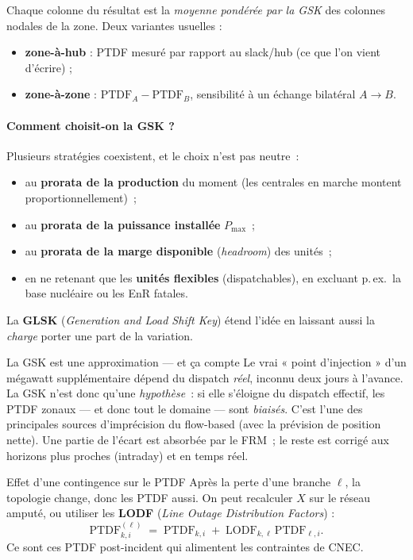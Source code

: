 \documentclass[11pt,a4paper]{article}
\begin{document}
\noindent Chaque colonne du résultat est la \emph{moyenne pondérée par la
GSK} des colonnes nodales de la zone. Deux variantes usuelles :
\begin{itemize}[nosep,leftmargin=1.4em]
  \item \textbf{zone-à-hub} : PTDF mesuré par rapport au slack/hub
        (ce que l'on vient d'écrire) ;
  \item \textbf{zone-à-zone} : $\mathrm{PTDF}_A - \mathrm{PTDF}_B$,
        sensibilité à un échange bilatéral $A\!\to\!B$.
\end{itemize}

\paragraph{Comment choisit-on la GSK ?} Plusieurs stratégies coexistent, et
le choix n'est pas neutre~:
\begin{itemize}[nosep,leftmargin=1.4em]
  \item au \textbf{prorata de la production} du moment (les centrales en
        marche montent proportionnellement)~;
  \item au \textbf{prorata de la puissance installée} $P_{\max}$~;
  \item au \textbf{prorata de la marge disponible} (\emph{headroom}) des
        unités~;
  \item en ne retenant que les \textbf{unités flexibles} (dispatchables),
        en excluant p.\,ex.\ la base nucléaire ou les EnR fatales.
\end{itemize}
La \textbf{GLSK} (\emph{Generation and Load Shift Key}) étend l'idée en
laissant aussi la \emph{charge} porter une part de la variation.

\begin{rembox}{La GSK est une approximation — et ça compte}
Le vrai « point d'injection » d'un mégawatt supplémentaire dépend du dispatch
\emph{réel}, inconnu deux jours à l'avance. La GSK n'est donc qu'une
\emph{hypothèse}~: si elle s'éloigne du dispatch effectif, les PTDF zonaux —
et donc tout le domaine — sont \emph{biaisés}. C'est l'une des principales
sources d'imprécision du flow-based (avec la prévision de position nette).
Une partie de l'écart est absorbée par le FRM~; le reste est corrigé aux
horizons plus proches (intraday) et en temps réel.
\end{rembox}

\begin{rembox}{Effet d'une contingence sur le PTDF}
Après la perte d'une branche $\ell$, la topologie change, donc les PTDF
aussi. On peut recalculer $X$ sur le réseau amputé, ou utiliser les
\textbf{LODF} (\emph{Line Outage Distribution Factors}) :
\[
  \mathrm{PTDF}^{(\ell)}_{k,i} \;=\; \mathrm{PTDF}_{k,i}
     \;+\; \mathrm{LODF}_{k,\ell}\,\mathrm{PTDF}_{\ell,i}.
\]
Ce sont ces PTDF post-incident qui alimentent les contraintes de CNEC.
\end{rembox}
\end{document}
